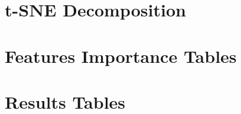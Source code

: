 \documentclass[a4paper, 12pt]{report}
\begin{document}
\appendix
\chapter{t-SNE Decomposition} \label{appendix:tsne}


\chapter{Features Importance Tables} \label{appendix:features_tables}








\chapter{Results Tables}
\label{appendix:results_tables}


\printbibliography
\end{document}
